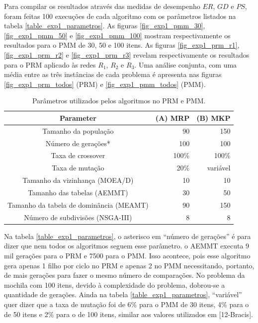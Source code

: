 Para compilar os resultados através das medidas de desempenho $ER$, $GD$ e $PS$, foram feitas 100 execuções de cada algoritmo com os parâmetros listados na tabela \ref{table_exp1_parametros}. As figuras \ref{fig_exp1_pmm_30}, \ref{fig_exp1_pmm_50} e \ref{fig_exp1_pmm_100} mostram respectivamente os resultados para o PMM de 30, 50 e 100 itens. As figuras \ref{fig_exp1_prm_r1}, \ref{fig_exp1_prm_r2} e \ref{fig_exp1_prm_r3} revelam respectivamente os resultados para o PRM aplicado às redes $R_1$, $R_2$ e $R_3$. Uma análise conjunta, com uma média entre as três instâncias de cada problema é apresenta nas figuras \ref{fig_exp1_prm_todos} (PRM) e \ref{fig_exp1_pmm_todos} (PMM).

\begin{table}[!htbp]
	\caption{Parâmetros utilizados pelos algoritmos no PRM e PMM.}
	\begin{center}
		\begin{tabular}{c|r|r}
			\textbf{Parameter} & \textbf{(A) MRP} &  \textbf{(B) MKP} \\ %
			\hline
			Tamanho da população                    &    90 &      150 \\ %
			Número de gerações*                     &   100 &      100 \\ %
			Taxa de crossover                       & 100\% &    100\% \\ %
			Taxa de mutação                         &  20\% & variável \\ %
			Tamanho da vizinhança (MOEA/D)          &    10 &       10 \\ %
			Tamanho das tabelas (AEMMT)             &    30 &       50 \\ %
			Tamanho da tabela de dominância (MEAMT) &    90 &      150 \\ %
			Número de subdivisões (NSGA-III)        &     8 &        8 \\
			\hline
		\end{tabular}
		\label{tab_Params}
	\end{center}
\end{table}

Na tabela \ref{table_exp1_parametros}, o asterisco em ``número de gerações'' é para dizer que nem todos os algoritmos seguem esse parâmetro. o AEMMT executa 9 mil gerações para o PRM e 7500 para o PMM. Isso acontece, pois esse algoritmo gera apenas 1 filho por ciclo no PRM e apenas 2 no PMM necessitando, portanto, de mais gerações para fazer o mesmo número de comparações. No problema da mochila com 100 itens, devido à complexidade do problema, dobrou-se a quantidade de gerações. Ainda na tabela \ref{table_exp1_parametros}, ``variável'' quer dizer que a taxa de mutação foi de 6\% para o PMM de 30 itens, 4\% para o de 50 itens e 2\% para o de 100 itens, similar aos valores utilizados em [12-Bracis].

